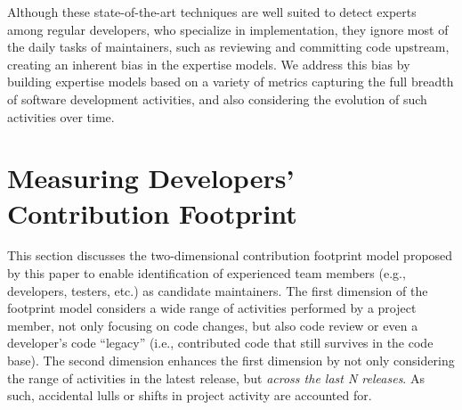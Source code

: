 Although these state-of-the-art techniques are well suited to detect experts among regular developers, who specialize in implementation, they %
ignore most of the daily tasks of maintainers, such as reviewing and committing code upstream, creating an inherent bias in the expertise models. We address this bias by building expertise models based on a variety of metrics capturing the full breadth of software development activities, and also considering the evolution of such activities over time.




















\section{Measuring Developers' Contribution Footprint}
\label{sec:expertise-formula}

This section discusses the two-dimensional contribution footprint model proposed by this paper to enable identification of experienced team members (e.g., developers, testers, etc.) as candidate maintainers. The first dimension of the footprint model considers a wide range of activities performed by a project member, not only focusing on code changes, but also code review or even a developer's code ``legacy'' (i.e., contributed code that still survives in the code base). The second dimension enhances the first dimension by not only considering the range of activities in the latest release, but \emph{across the last N releases}. As such, accidental lulls or shifts in project activity are accounted for.

